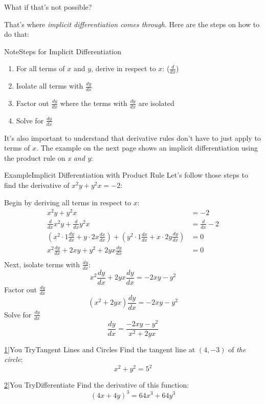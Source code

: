\documentclass{MathNotes}
\newenvironment{example}[1]{\begin{BlueBox}{Example}{#1}}{\end{BlueBox}}
\newenvironment{note}[1]{\begin{YellowBox}{Note}{#1}}{\end{YellowBox}}
\newenvironment{practice}[2]{\begin{PurpleBox}{\texorpdfstring{#1}\Big|You Try}{#2}}{\end{PurpleBox}}
\begin{document}
What if that's not possible?

That's where \textit{implicit differentiation comes through}. Here are the
steps on how to do that:

\begin{note}{Steps for Implicit Differentiation}
	\begin{enumerate}
		\item For all terms of $x$ and $y$, derive in respect to $x$:
		      ($\displaystyle\frac{d}{dx}$)
		\item Isolate all terms with $\displaystyle\frac{dy}{dx}$
		\item Factor out $\displaystyle\frac{dy}{dx}$ where the terms with $\displaystyle\frac{dy}{dx}$
		      are isolated
		\item Solve for $\displaystyle\frac{dy}{dx}$
	\end{enumerate}
\end{note}
It's also important to understand that derivative rules don't have to just
apply to terms of $x$. The example on the next page shows an implicit
differentiation using the product rule on \textit{x and y}:
\newpage
{}
\begin{example}{Implicit Differentiation with Product Rule}
	Let's follow those steps to find the derivative of
	$\displaystyle x^2y+y^2x=-2$:

	Begin by deriving all terms in respect to $x$:
	\begin{align*}
		x^2y+y^2x                                       & =-2             \\
		\frac{d}{dx}x^2y+\frac{d}{dx}y^2x               & =\frac{d}{dx}-2 \\
		(x^2\cdot 1\frac{dy}{dx}+y\cdot2x\frac{dx}{dx})
		+(y^2\cdot1\frac{dx}{dx}+x\cdot2y\frac{dy}{dx}) & =0              \\
		x^2\frac{dy}{dx}+2xy+y^2+2yx\frac{dy}{dx}       & =0              \\
	\end{align*}
	Next, isolate terms with $\frac{dy}{dx}$:
	$$x^2\frac{dy}{dx}+2yx\frac{dy}{dx}=-2xy-y^2$$
	Factor out $\frac{dy}{dx}$
	$$(x^2+2yx)\frac{dy}{dx}=-2xy-y^2$$
	Solve for $\frac{dy}{dx}$
	$$\frac{dy}{dx}=\frac{-2xy-y^2}{x^2+2yx}$$
\end{example}
\begin{multicols}{2}
	\begin{practice}{\hyperref[ans:2.4-1]{1}}{Tangent Lines and Circles}
		\label{prac:2.4-1}
		Find the tangent line at $(4,-3)$ of \textit{the circle}:
		$$x^2+y^2=5^2$$
	\end{practice}
	\begin{practice}{\hyperref[ans:2.4-2]{2}}{Differentiate}\label{prac:2.4-2}
		Find the derivative of this function: $$(4x+4y)^3=64x^3+64y^3$$
	\end{practice}
\end{multicols}
\end{document}
